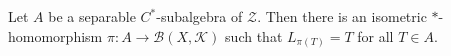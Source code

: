 Let $A$ be a separable $C^*$-subalgebra of $\mathcal{Z}$. Then there is an isometric $\ast$-homomorphism $\pi: A \to \mathcal{B}(X, \mathcal{K})$ such that $L_{\pi(T)} = T$ for all $T \in A$.
